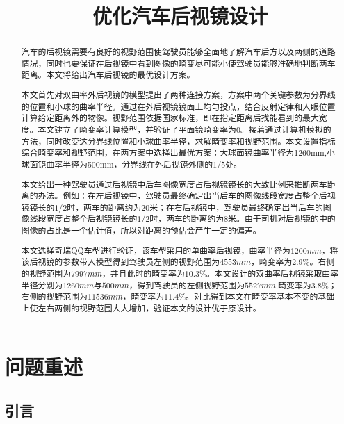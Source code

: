 \documentclass[withoutpreface,bwprint]{cumcmthesis} %
\title{优化汽车后视镜设计}
\begin{document}
 \maketitle
\begin{abstract}
 
\par 汽车的后视镜需要有良好的视野范围使驾驶员能够全面地了解汽车后方以及两侧的道路情况，同时也要保证在后视镜中看到图像的畸变尽可能小使驾驶员能够准确地判断两车距离。本文将给出汽车后视镜的最优设计方案。
\par 本文首先对双曲率外后视镜的模型提出了两种连接方案，方案中两个关键参数为分界线的位置和小球的曲率半径。通过在外后视镜镜面上均匀投点，结合反射定律和人眼位置计算给定距离外的物像。视野范围依据国家标准，即在指定距离后找能看到的最大宽度。本文建立了畸变率计算模型，并验证了平面镜畸变率为0。接着通过计算机模拟的方法，同时改变这分界线位置和小球曲率半径，求解畸变率和视野范围。本文设置指标综合畸变率和视野范围，在两方案中选择出最优方案：大球面镜曲率半径为1260mm,小球面镜曲率半径为500mm，分界线在外后视镜外侧的$1/5$处。
\par 本文给出一种驾驶员通过后视镜中后车图像宽度占后视镜镜长的大致比例来推断两车距离的办法。例如：在左后视镜中，驾驶员最终确定出当后车的图像线段宽度占整个后视镜镜长的$1/2$时，两车的距离约为20米；在右后视镜中，驾驶员最终确定出当后车的图像线段宽度占整个后视镜镜长的$1/2$时，两车的距离约为8米。由于司机对后视镜的中的图像的占比是一个估计值，所以对距离的预估会产生一定的偏差。
\par 本文选择奇瑞QQ车型进行验证，该车型采用的单曲率后视镜，曲率半径为$1200mm$，将该后视镜的参数带入模型得到驾驶员左侧的视野范围为$4553mm$，畸变率为$2.9\%$。右侧的视野范围为$7997mm$，并且此时的畸变率为$10.3\%$。本文设计的双曲率后视镜采取曲率半径分别为$1260mm$与$500mm$，得到驾驶员的左侧视野范围为$5527mm$,畸变率为$3.8\%$；右侧的视野范围为$11536mm$，畸变率为$11.4\%$。对比得到本文在畸变率基本不变的基础上使左右两侧的视野范围大大增加，验证本文的设计优于原设计。
 
\end{abstract}

\tableofcontents
\newpage

\section{问题重述}
 

\subsection{引言}
\end{document}
